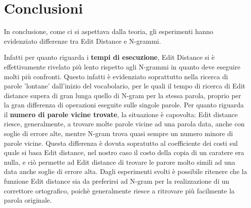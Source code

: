 \documentclass[a4paper,12pt]{article}
\begin{document}
\section{Conclusioni}
In conclusione, come ci si aspettava dalla teoria, gli esperimenti hanno evidenziato differenze tra Edit Distance e N-grammi.

Infatti per quanto riguarda i \textbf{tempi di esecuzione}, Edit Distance si è effettivamente rivelato più lento rispetto agli N-grammi in quanto deve eseguire molti più confronti.
\newline
Questo infatti è evidenziato soprattutto nella ricerca di parole 'lontane' dall'inizio del vocabolario, per le quali il tempo di ricerca di Edit distance supera di gran lunga quello di N-gram per la stessa parola, proprio per la gran differenza di operazioni eseguite sulle singole parole.
\newline
Per quanto riguarda il \textbf{numero di parole vicine trovate}, la situazione è capovolta:
Edit distance riesce, generalmente, a trovare molte parole vicine ad una parola data, anche con soglie di errore alte, mentre N-gram trova quasi sempre un numero minore di parole vicine.
\newline
Questa differenza è dovuta sopratutto al coefficiente dei costi sul quale si basa Edit distance, nel nostro caso il costo della copia di un caratere era nulla, e ciò permette ad Edit distance di trovare le parore molto simili ad una data anche soglie di errore alta.
\newline
Dagli esperimenti svolti è possibile ritenere che la funzione Edit distance sia da preferirsi ad N-gram per la realizzazione di un correttore ortografico, poichè generalmente riesce a ritrovare più facilmente la parola originale.
\end{document}
